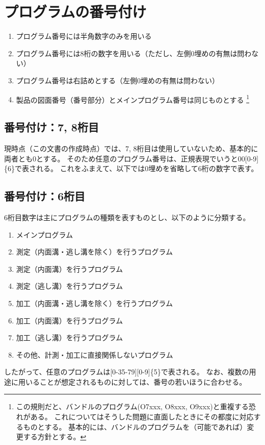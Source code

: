 \section{プログラムの番号付け}
\begin{enumerate}
\item プログラム番号には半角数字のみを用いる
\item プログラム番号には8桁の数字を用いる（ただし、左側0埋めの有無は問わない）
\item プログラム番号は右詰めとする（左側0埋めの有無は問わない）
\item 製品の図面番号（番号部分）とメインプログラム番号は同じものとする
\footnote{この規則だと、バンドルのプログラム(O7xxx, O8xxx, O9xxx)と重複する恐れがある。
これについてはそうした問題に直面したときにその都度に対応するものとする。
基本的には、バンドルのプログラムを（可能であれば）変更する方針とする。}
\end{enumerate}



\subsection{番号付け：7, 8桁目}
現時点（この文書の作成時点）では、7, 8桁目は使用していないため、基本的に両者とも0とする。
そのため任意のプログラム番号は、正規表現でいうと00[0-9]\{6\}で表される。
これをふまえて、以下では0埋めを省略して6桁の数字で表す。


\subsection{番号付け：6桁目}
6桁目数字は主にプログラムの種類を表すものとし、以下のように分類する。
\begin{enumerate}[start=0]
\item メインプログラム
\item 測定（内面溝・逃し溝を除く）を行うプログラム
\item 測定（内面溝）を行うプログラム
\item 測定（逃し溝）を行うプログラム
\addtocounter{enumi}{1}
\item 加工（内面溝・逃し溝を除く）を行うプログラム
\item 加工（内面溝）を行うプログラム
\item 加工（逃し溝）を行うプログラム
\addtocounter{enumi}{1}
\item その他、計測・加工に直接関係しないプログラム
\end{enumerate}
したがって、任意のプログラムは[0-35-79][0-9]\{5\}で表される。
なお、複数の用途に用いることが想定されるものに対しては、番号の若いほうに合わせる。



